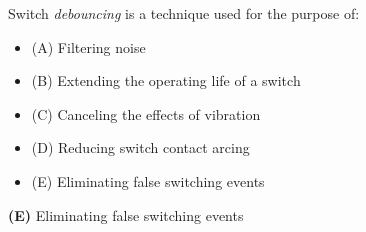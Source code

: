 

Switch {\it debouncing} is a technique used for the purpose of:

\begin{itemize}
\item{(A)} Filtering noise
\vskip 5pt 
\item{(B)} Extending the operating life of a switch
\vskip 5pt 
\item{(C)} Canceling the effects of vibration
\vskip 5pt 
\item{(D)} Reducing switch contact arcing
\vskip 5pt 
\item{(E)} Eliminating false switching events
\end{itemize}







{\bf (E)} Eliminating false switching events
 










